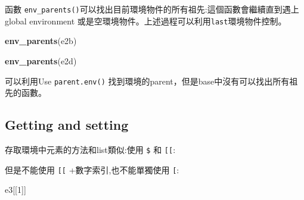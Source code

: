 \documentclass[]{book}
\newenvironment{Shaded}{\begin{snugshade}}{\end{snugshade}}
\newcommand{\DataTypeTok}[1]{\textcolor[rgb]{0.13,0.29,0.53}{#1}}
\newcommand{\DecValTok}[1]{\textcolor[rgb]{0.00,0.00,0.81}{#1}}
\newcommand{\KeywordTok}[1]{\textcolor[rgb]{0.13,0.29,0.53}{\textbf{#1}}}
\newcommand{\NormalTok}[1]{#1}
\newcommand{\OperatorTok}[1]{\textcolor[rgb]{0.81,0.36,0.00}{\textbf{#1}}}
\newcommand{\StringTok}[1]{\textcolor[rgb]{0.31,0.60,0.02}{#1}}
\theoremstyle{definition}
\theoremstyle{definition}
\theoremstyle{definition}
\theoremstyle{remark}
\begin{document}
函數
\texttt{env\_parents()}可以找出目前環境物件的所有祖先:這個函數會繼續直到遇上global
environment 或是空環境物件。上述過程可以利用\texttt{last}環境物件控制。

\begin{Shaded}
\begin{Highlighting}[]
\KeywordTok{env_parents}\NormalTok{(e2b)}
\end{Highlighting}
\end{Shaded}

\begin{Shaded}
\begin{Highlighting}[]
\KeywordTok{env_parents}\NormalTok{(e2d)}
\end{Highlighting}
\end{Shaded}

可以利用Use \texttt{parent.env()}
找到環境的parent，但是base中沒有可以找出所有祖先的函數。

\hypertarget{getting-and-setting}{%
\subsection{Getting and setting}\label{getting-and-setting}}

存取環境中元素的方法和list類似:使用 \texttt{\$} 和 \texttt{{[}{[}}:

\begin{Shaded}
\end{Shaded}

\begin{Shaded}
\end{Shaded}

但是不能使用 \texttt{{[}{[}} +數字索引,也不能單獨使用 \texttt{{[}}:

\begin{Shaded}
\begin{Highlighting}[]
\NormalTok{e3[[}\DecValTok{1}\NormalTok{]]}
\end{Highlighting}
\end{Shaded}
\end{document}
